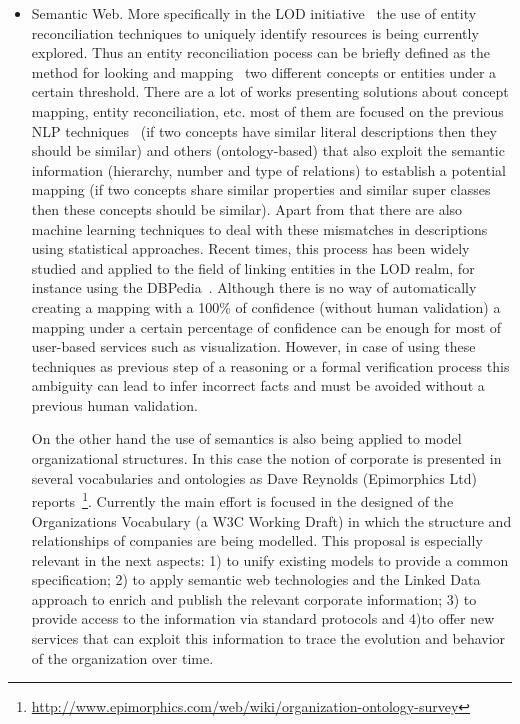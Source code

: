 \documentclass{llncs}
\begin{document}
\begin{itemize}
 \item Semantic Web. More specifically in the LOD initiative~\cite{Berners-Lee-2006} the use of entity reconciliation techniques to uniquely identify resources 
 is being currently explored. Thus an entity reconciliation pocess can be briefly defined as the method for looking and mapping~\cite{DBLP:conf/semweb/IseleJB10,DBLP:conf/icwe/IseleJB12} two different 
 concepts or entities under a certain threshold. There are a lot of  works presenting solutions about concept mapping, entity reconciliation, etc. 
 most of them are focused on the previous NLP techniques~\cite{conf/www/MaaliCP11,Serimi} (if two concepts have similar literal descriptions then they should be similar) 
 and others (ontology-based) that also exploit the semantic information (hierarchy, number and type of relations) to establish a potential mapping 
 (if two concepts share similar properties and similar super classes then these concepts should be similar). Apart from that 
 there are also machine learning techniques to deal with these mismatches in descriptions using statistical approaches. Recent times, 
 this process has been widely studied and applied to the field of linking entities in the LOD realm, for instance using the DBPedia~\cite{Mendes:2011:DSS:2063518.2063519}. 
 Although there is no way of automatically creating a mapping with a 100\% of confidence (without human validation) a mapping under a certain percentage of confidence can be 
 enough for most of user-based services such as visualization. However, in case of using these techniques as previous step of a reasoning or 
 a formal verification process this ambiguity can lead to infer incorrect facts and must be avoided without a previous human validation. 

 On the other hand the use of semantics is also being applied to model organizational structures. In this case the notion 
 of corporate is presented in several vocabularies and ontologies as Dave Reynolds (Epimorphics Ltd) reports~\footnote{\url{http://www.epimorphics.com/web/wiki/organization-ontology-survey}}. 
 Currently the main effort is focused in the designed of the Organizations Vocabulary (a W3C Working Draft) in which the structure and 
 relationships of companies are being modelled. This proposal is especially relevant in the next aspects:  
 1) to unify existing models to provide a common specification; 2) to apply semantic web technologies and the Linked Data approach to enrich 
 and publish the relevant corporate information; 3) to provide access to the information via standard protocols 
 and 4)to  offer new services that can exploit this information to trace the evolution and behavior of the organization over time.


\end{itemize}
\end{document}
